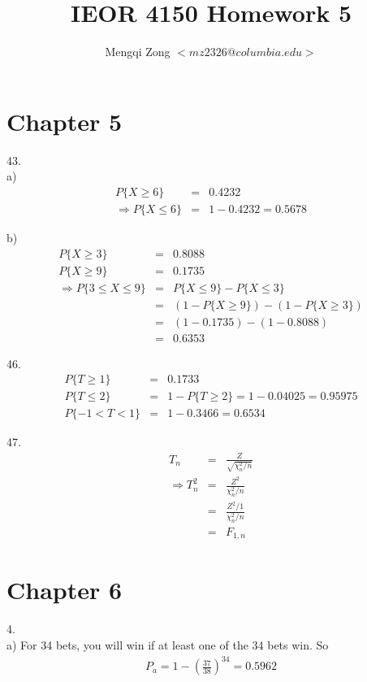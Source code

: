 \documentclass[12pt]{article}
\title{IEOR 4150 Homework 5}
\author{Mengqi Zong $<mz2326@columbia.edu>$}
\begin{document}
\maketitle

\setlength{\parindent}{0in}

\section*{Chapter 5}

43. \\

a)
\begin{eqnarray*}
  P \{ X \ge 6 \} &=& 0.4232 \\
  \Rightarrow P \{ X \le 6 \} &=& 1 - 0.4232 = 0.5678
\end{eqnarray*}

b)
\begin{eqnarray*}
  P \{ X \ge 3 \} &=& 0.8088 \\
  P \{ X \ge 9 \} &=& 0.1735 \\
  \Rightarrow   P \{ 3 \le X \le 9 \}
  &=& P \{ X \le 9 \} - P \{ X \le 3 \} \\
  &=& (1 - P \{ X \ge 9 \}) - (1 - P \{ X \ge 3 \}) \\
  &=& (1 - 0.1735) - (1 - 0.8088) \\
  &=& 0.6353
\end{eqnarray*}

46.
\begin{eqnarray*}
  P \{ T \ge 1 \} &=& 0.1733 \\
  P \{ T \le 2 \} &=& 1 - P \{ T \ge 2 \} = 1 - 0.04025 = 0.95975 \\
  P \{ -1 < T < 1 \} &=& 1 - 0.3466 = 0.6534
\end{eqnarray*}

47.
\begin{eqnarray*}
  T_n &=& \frac {Z}{\sqrt{\chi_n^2 / n}} \\
  \Rightarrow T_n^2 &=& \frac {Z^2}{\chi_n^2 / n} \\
  &=& \frac {Z^2 / 1}{\chi_n^2 / n} \\
  &=& F_{1,n}
\end{eqnarray*}

\section*{Chapter 6}

4. \\
a) For 34 bets, you will win if at least one of the 34 bets win. So
\begin{eqnarray*}
  P_a = 1 - (\frac{37}{38})^{34} = 0.5962
\end{eqnarray*}
\end{document}
